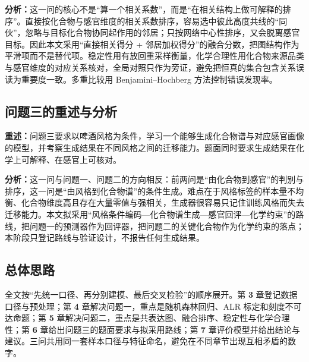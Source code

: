 \textbf{分析：}这一问的核心不是“算一个相关系数”，而是“在相关结构上做可解释的排序”。直接按化合物与感官维度的相关系数排序，容易选中彼此高度共线的“同伙”，忽略与目标化合物协同起作用的邻居；只按网络中心性排序，又会脱离感官目标。因此本文采用“直接相关得分 + 邻居加权得分”的融合分数，把图结构作为平滑项而不是替代项。稳定性用有放回重采样衡量，化学合理性用化合物来源品类与感官维度的对应关系核对，全局对照只作为旁证，避免把恒真的集合包含关系误读为重要度一致。多重比较用 Benjamini--Hochberg 方法控制错误发现率\cite{benjamini1995}。

\subsection{问题三的重述与分析}

\textbf{重述：}问题三要求以啤酒风格为条件，学习一个能够生成化合物谱与对应感官画像的模型，并考察生成结果在不同风格之间的迁移能力。题面同时要求生成结果在化学上可解释、在感官上可核对。

\textbf{分析：}这一问与问题一、问题二的方向相反：前两问是“由化合物到感官”的判别与排序，这一问是“由风格到化合物谱”的条件生成。难点在于风格标签的样本量不均衡、化合物维度高且存在大量零值与强相关，生成器很容易只记住训练风格而失去迁移能力。本文拟采用“风格条件编码—化合物谱生成—感官回评—化学约束”的路线，把问题一的预测器作为回评器，把问题二的关键化合物作为化学约束的落点；本阶段只登记路线与验证设计，不报告任何生成结果。

\subsection{总体思路}

全文按“先统一口径、再分别建模、最后交叉检验”的顺序展开。第 \textbf{3} 章登记数据口径与预处理；第 \textbf{4} 章解决问题一，重点是随机森林回归、ALR 标定和刻度不可达命题；第 \textbf{5} 章解决问题二，重点是共表达图、融合排序、稳定性与化学合理性；第 \textbf{6} 章给出问题三的题面要求与拟采用路线；第 \textbf{7} 章评价模型并给出结论与建议。三问共用同一套样本口径与特征命名，避免在不同章节出现互相矛盾的数字。
